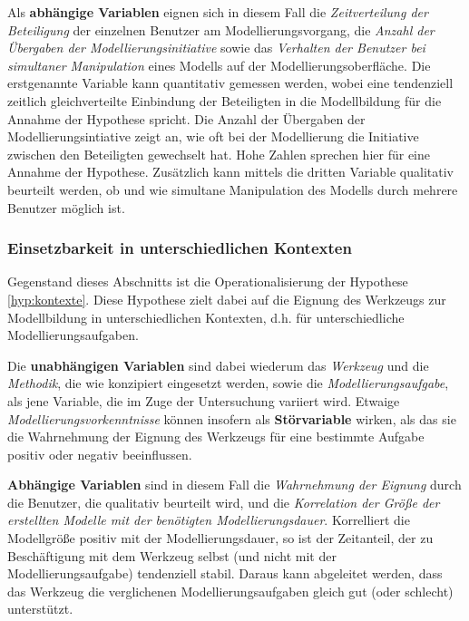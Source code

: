 Als \textbf{abhängige Variablen} eignen sich in diesem Fall die \emph{Zeitverteilung der Beteiligung} der einzelnen Benutzer am Modellierungsvorgang, die \emph{Anzahl der Übergaben der Modellierungsinitiative} sowie das \emph{Verhalten der Benutzer bei simultaner Manipulation} eines Modells auf der Modellierungsoberfläche. Die erstgenannte Variable kann quantitativ gemessen werden, wobei eine tendenziell zeitlich gleichverteilte Einbindung der Beteiligten in die Modellbildung für die Annahme der Hypothese spricht. Die Anzahl der Übergaben der Modellierungsintiative zeigt an, wie oft bei der Modellierung die Initiative zwischen den Beteiligten gewechselt hat. Hohe Zahlen sprechen hier für eine Annahme der Hypothese. Zusätzlich kann mittels die dritten Variable qualitativ beurteilt werden, ob und wie simultane Manipulation des Modells durch mehrere Benutzer möglich ist.


\subsubsection{Einsetzbarkeit in unterschiedlichen Kontexten} %
\label{ssub:einsetzbarkeit_in_unterschiedlichen_kontexten}

Gegenstand dieses Abschnitts ist die Operationalisierung der Hypothese \ref{hyp:kontexte}. Diese Hypothese zielt dabei auf die Eignung des Werkzeugs zur Modellbildung in unterschiedlichen Kontexten, d.h. für unterschiedliche Modellierungsaufgaben. 

Die \textbf{unabhängigen Variablen} sind dabei wiederum das \emph{Werkzeug} und die \emph{Methodik}, die wie konzipiert eingesetzt werden, sowie die \emph{Modellierungsaufgabe}, als jene Variable, die im Zuge der Untersuchung variiert wird. Etwaige \emph{Modellierungsvorkenntnisse} können insofern als \textbf{Störvariable} wirken, als das sie die Wahrnehmung der Eignung des Werkzeugs für eine bestimmte Aufgabe positiv oder negativ beeinflussen.

\textbf{Abhängige Variablen} sind in diesem Fall die \emph{Wahrnehmung der Eignung} durch die Benutzer, die qualitativ beurteilt wird, und die \emph{Korrelation der Größe der erstellten Modelle mit der benötigten Modellierungsdauer}. Korrelliert die Modellgröße positiv mit der Modellierungsdauer, so ist der Zeitanteil, der zu Beschäftigung mit dem Werkzeug selbst (und nicht mit der Modellierungsaufgabe) tendenziell stabil. Daraus kann abgeleitet werden, dass das Werkzeug die verglichenen Modellierungsaufgaben gleich gut (oder schlecht) unterstützt.

